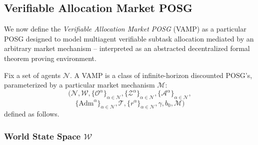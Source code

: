 \subsection{Verifiable Allocation Market POSG}


We now define the \emph{Verifiable Allocation Market POSG} (VAMP) as a particular POSG designed to model multiagent verifiable subtask allocation mediated by an arbitrary market mechanism -- interpreted as an abstracted decentralized formal theorem proving environment.

Fix a set of agents $\mathcal{N}$. A VAMP is a class of infinite-horizon discounted POSG's, parameterized by a particular market mechanism $\mathscr{M}$:
\[
\Big(\mathcal{N},\mathcal{W},\{\mathcal{O}^\alpha\}_{\alpha\in\mathcal{N}},\{\mathcal{Z}^\alpha\}_{\alpha\in\mathcal{N}},\{\mathcal{A}^\alpha\}_{\alpha\in\mathcal{N}},
\]\[\{\mathrm{Adm}^\alpha\}_{\alpha\in\mathcal{N}},\mathcal{T},
\{r^\alpha\}_{\alpha\in\mathcal{N}},\gamma,b_0, \mathscr{M}\Big)
\]
defined as follows.

\subsubsection{World State Space $\mathcal{W}$}

